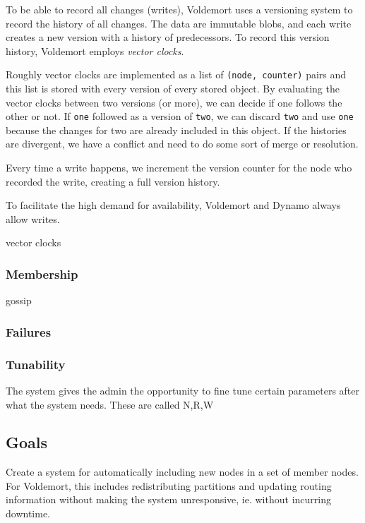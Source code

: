 To be able to record all changes (writes), Voldemort uses a versioning system to record the history of all changes. The data are immutable blobs, and each write creates a new version with a history of predecessors.
To record this version history, Voldemort employs \emph{vector clocks}.

Roughly vector clocks are implemented as a list of \texttt{(node, counter)} pairs and this list is stored with every version of every stored object.
By evaluating the vector clocks between two versions (or more), we can decide if one follows the other or not. If \texttt{one} followed as a version of \texttt{two}, we can discard \texttt{two} and use \texttt{one} because the changes for two are already included in this object. If the histories are divergent, we have a conflict and need to do some sort of merge or resolution.

Every time a write happens, we increment the version counter for the node who recorded the write, creating a full version history.



To facilitate the high demand for availability, Voldemort and Dynamo always allow writes.


vector clocks

\subsubsection{Membership}
gossip

\subsubsection{Failures}

\subsubsection{Tunability}
The system gives the admin the opportunity to fine tune certain parameters after what the system needs.
These are called N,R,W

\subsection{Goals}
Create a system for automatically including new nodes in a set of member nodes.
For Voldemort, this includes redistributing partitions and updating routing information without making the system unresponsive, ie. without incurring downtime.


